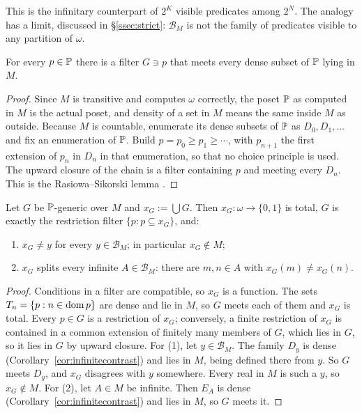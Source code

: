 This is the infinitary counterpart of $2^K$ visible predicates among $2^N$. The analogy has a
limit, discussed in \S\ref{ssec:strict}: $\mathcal B_M$ is not the family of predicates visible to
any partition of $\omega$.

\begin{lemma}\label{lem:RS}
For every $p\in\mathbb{P}$ there is a filter $G\ni p$ that meets every dense subset of $\mathbb{P}$ lying in
$M$.
\end{lemma}

\begin{proof}
Since $M$ is transitive and computes $\omega$ correctly, the poset $\mathbb{P}$ as computed in $M$ is
the actual poset, and density of a set in $M$ means the same inside $M$ as outside. Because $M$ is
countable, enumerate its dense subsets of $\mathbb{P}$ as $D_0,D_1,\dots$ and fix an enumeration of
$\mathbb{P}$. Build $p=p_0\ge p_1\ge\cdots$, with $p_{n+1}$ the first extension of $p_n$ in $D_n$ in that
enumeration, so that no choice principle is used. The upward closure of the chain is a filter
containing $p$ and meeting every $D_n$. This is the Rasiowa--Sikorski lemma
\citep{RasiowaSikorski1950}.
\end{proof}

\begin{theorem}\label{thm:novelty}
Let $G$ be $\mathbb{P}$-generic over $M$ and $x_G:=\bigcup G$. Then $x_G\colon\omega\to\{0,1\}$ is
total, $G$ is exactly the restriction filter $\{p:p\subseteq x_G\}$, and:
\begin{enumerate}\itemsep0pt
\item $x_G\ne y$ for every $y\in\mathcal B_M$; in particular $x_G\notin M$;
\item $x_G$ splits every infinite $A\in\mathcal B_M$: there are $m,n\in A$ with $x_G(m)\ne x_G(n)$.
\end{enumerate}
\end{theorem}

\begin{proof}
Conditions in a filter are compatible, so $x_G$ is a function. The sets $T_n=\{p:n\in\operatorname{dom} p\}$ are
dense and lie in $M$, so $G$ meets each of them and $x_G$ is total. Every $p\in G$ is a
restriction of $x_G$; conversely, a finite restriction of $x_G$ is contained in a common extension
of finitely many members of $G$, which lies in $G$, so it lies in $G$ by upward closure. For (1),
let $y\in\mathcal B_M$. The family $D_y$ is dense (Corollary~\ref{cor:infinitecontrast}) and lies in
$M$, being defined there from $y$. So $G$ meets $D_y$, and $x_G$ disagrees with $y$ somewhere. Every
real in $M$ is such a $y$, so $x_G\notin M$. For (2), let $A\in M$ be infinite. Then $E_A$ is dense
(Corollary~\ref{cor:infinitecontrast}) and lies in $M$, so $G$ meets it.
\end{proof}

